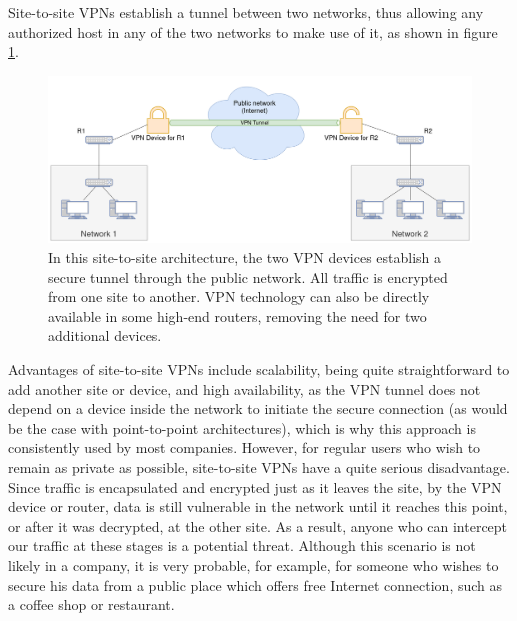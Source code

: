\documentclass[a4paper,12pt]{report}
\begin{document}
		Site-to-site VPNs establish a tunnel between two networks, thus allowing any authorized host in any of the two networks to make use of it, as shown in figure \ref{fig:site-to-site_VPN}.
		\begin{figure}[h]
			\includegraphics[width=\textwidth]{site-to-site_VPN}
			\centering
			\caption{In this site-to-site architecture, the two VPN devices establish a secure tunnel through the public network. All traffic is encrypted from one site to another. VPN technology can also be directly available in some high-end routers, removing the need for two additional devices.}
			\label{fig:site-to-site_VPN}
		\end{figure}
		
		Advantages of site-to-site VPNs include scalability, being quite straightforward to add another site or device, and high availability, as the VPN tunnel does not depend on a device inside the network to initiate the secure connection (as would be the case with point-to-point architectures), which is why this approach is consistently used by most companies. However, for regular users who wish to remain as private as possible, site-to-site VPNs have a quite serious disadvantage. Since traffic is encapsulated and encrypted just as it leaves the site, by the VPN device or router, data is still vulnerable in the network until it reaches this point, or after it was decrypted, at the other site. As a result, anyone who can intercept our traffic at these stages is a potential threat. Although this scenario is not likely in a company, it is very probable, for example, for someone who wishes to secure his data from a public place which offers free Internet connection, such as a coffee shop or restaurant.
		
\end{document}
